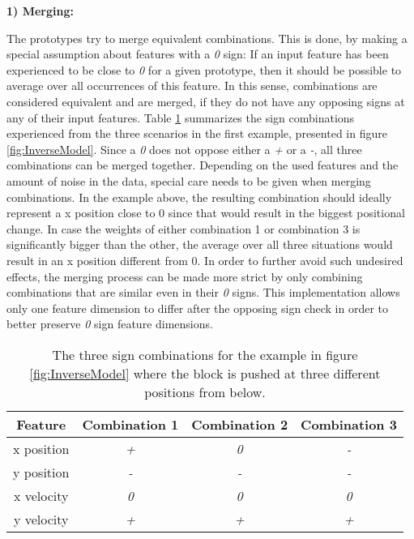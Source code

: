 \textbf{1) Merging:}

The prototypes try to merge equivalent combinations. This is done, by making a special assumption about features with a \textit{0} sign: If an input feature has been experienced to be close to \textit{0} for a given prototype, then it should be possible to average over all occurrences of this feature. 
In this sense, combinations are considered equivalent and are merged, if they do not have any opposing signs at any of their input features.
Table \ref{tab:signCombinations2} summarizes the sign combinations experienced from the three scenarios in the first example, presented in figure \ref{fig:InverseModel}.
Since a \textit{0} does not oppose either a \textit{+} or a \textit{-}, all three combinations can be merged together.
Depending on the used features and the amount of noise in the data, special care needs to be given when merging combinations. In the example above, the resulting combination should ideally represent a x position close to 0 since that would result in the biggest positional change. In case the weights of either combination 1 or combination 3 is significantly bigger than the other, the average over all three situations would result in an x position different from 0.
In order to further avoid such undesired effects, the merging process can be made more strict by only combining combinations that are similar even in their \textit{0} signs.
This implementation allows only one feature dimension to differ after the opposing sign check in order to better preserve \textit{0} sign feature dimensions.

\begin{table}
	\centering
	\begin{tabular}{|c|c|c|c|}
		\hline Feature & Combination 1 & Combination 2 & Combination 3 \\ 
		\hline x position & \textit{+} & \textit{0} & \textit{-} \\ 
		\hline y position & \textit{-} & \textit{-} & \textit{-} \\ 
		\hline x velocity & \textit{0} & \textit{0} & \textit{0} \\
		\hline y velocity & \textit{+} & \textit{+} & \textit{+} \\ 
		\hline 
	\end{tabular} 
	\caption{The three sign combinations for the example in figure \ref{fig:InverseModel} where the block is pushed at three different positions from below.}
	\label{tab:signCombinations2}
\end{table}

